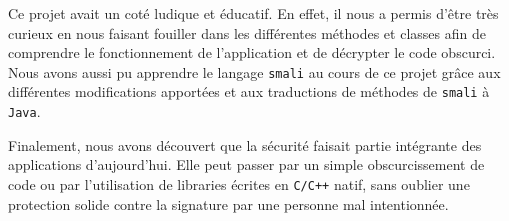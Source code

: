 
Ce projet avait un coté ludique et éducatif.
En effet, il nous a permis d'être très curieux en nous faisant fouiller dans les différentes méthodes et classes
afin de comprendre le fonctionnement de l'application et de décrypter le code obscurci.
Nous avons aussi pu apprendre le langage \texttt{smali} au cours de ce projet grâce aux différentes modifications apportées
et aux traductions de méthodes de \texttt{smali} à \texttt{Java}.

Finalement, nous avons découvert que la sécurité faisait partie intégrante des applications d'aujourd'hui.
Elle peut passer par un simple obscurcissement de code ou par l'utilisation de libraries écrites en \texttt{C/C++} natif,
sans oublier une protection solide contre la signature par une personne mal intentionnée.
